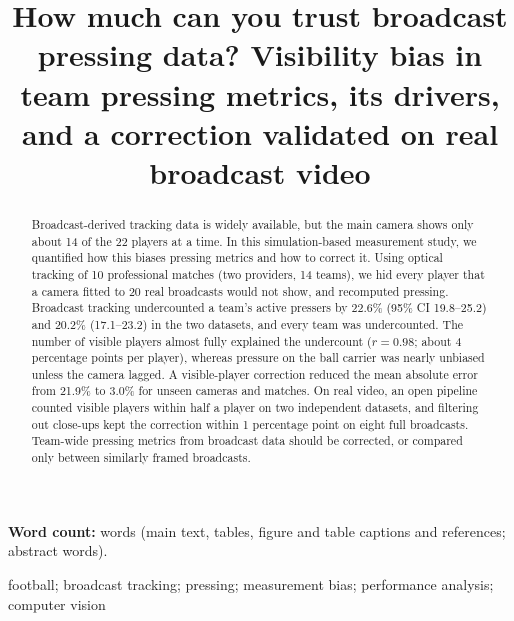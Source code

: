 \documentclass[]{interact}
\begin{document}

\title{How much can you trust broadcast pressing data? Visibility bias in team pressing metrics, its drivers, and a
correction validated on real broadcast video}

\ifanonymous
\author{}
\else
\author{
}
\fi

\maketitle

\noindent\textbf{Word count:} \wordcount{} words (main text, tables, figure and table captions and references; abstract
\abstractcount{} words).

\begin{abstract}
Broadcast-derived tracking data is widely available, but the main camera shows only about 14 of the 22 players at a
time. In this simulation-based measurement study, we quantified how this biases pressing metrics and how to correct it.
Using optical tracking of 10 professional matches (two providers, 14 teams), we hid every player that a camera fitted
to 20 real broadcasts would not show, and recomputed pressing. Broadcast tracking undercounted a team's active
pressers by 22.6\% (95\% CI 19.8--25.2) and 20.2\% (17.1--23.2) in the two datasets, and every team was undercounted.
The number of visible players almost fully explained the undercount ($r = 0.98$; about 4 percentage points per
player), whereas pressure on the ball carrier was nearly unbiased unless the camera lagged. A visible-player
correction reduced the mean absolute error from 21.9\% to 3.0\% for unseen cameras and matches. On real video, an
open pipeline counted visible players within half a player on two independent datasets, and filtering out close-ups
kept the correction within 1 percentage point on eight full broadcasts. Team-wide pressing metrics from broadcast
data should be corrected, or compared only between similarly framed broadcasts.
\end{abstract}

\begin{keywords}
football; broadcast tracking; pressing; measurement bias; performance analysis; computer vision
\end{keywords}

\end{document}
